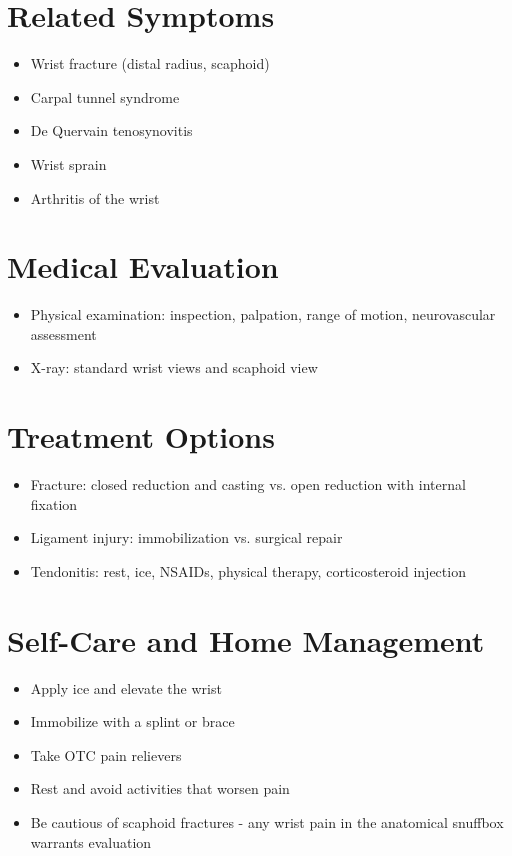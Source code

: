 \section*{Related Symptoms}
\begin{itemize}
\item Wrist fracture (distal radius, scaphoid)
\item Carpal tunnel syndrome
\item De Quervain tenosynovitis
\item Wrist sprain
\item Arthritis of the wrist
\end{itemize}

\section*{Medical Evaluation}
\begin{itemize}
\item Physical examination: inspection, palpation, range of motion, neurovascular assessment
\item X-ray: standard wrist views and scaphoid view
\end{itemize}

\section*{Treatment Options}
\begin{itemize}
\item Fracture: closed reduction and casting vs. open reduction with internal fixation
\item Ligament injury: immobilization vs. surgical repair
\item Tendonitis: rest, ice, NSAIDs, physical therapy, corticosteroid injection
\end{itemize}

\section*{Self-Care and Home Management}
\begin{itemize}
\item Apply ice and elevate the wrist
\item Immobilize with a splint or brace
\item Take OTC pain relievers
\item Rest and avoid activities that worsen pain
\item Be cautious of scaphoid fractures - any wrist pain in the anatomical snuffbox warrants evaluation
\end{itemize}

